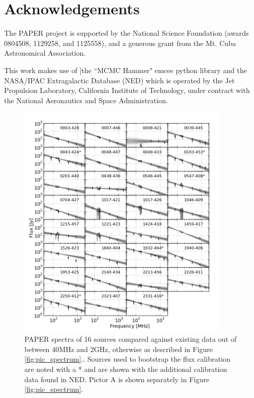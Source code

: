 \documentclass[preprint]{aastex}
\begin{document}
\section*{Acknowledgements}

The PAPER project is supported by the National Science Foundation (awards
0804508, 1129258, and 1125558), and a generous grant from the Mt. Cuba
Astronomical Association.

This work makes use of ]the ``MCMC Hammer" emcee python library \citep[
\url{http://danfm.ca/emcee/}]{ForemanMackey:2012p8684}  and the NASA/IPAC
Extragalactic Database (NED) which is operated by the Jet Propulsion
Laboratory, California Institute of Technology, under contract with the
National Aeronautics and Space Administration.



\begin{figure}[htbp]
\begin{center}
\includegraphics[width=0.9\textwidth]{plots/srcfig_1.png}
\end{center}
\caption{
PAPER spectra of 16 sources compared against existing data out of
\cite{Vollmer:2010p6422} between 40MHz and 2GHz, otherwise as described in
Figure \ref{fig:pic_spectrum}.\label{fig:srcs1}. Sources used to bootstrap the
flux calibration are noted with a * and are shown with the additional calibration data
found in NED. Pictor A is shown separately in Figure \ref{fig:pic_spectrum}.
}
\end{figure}
\end{document}
